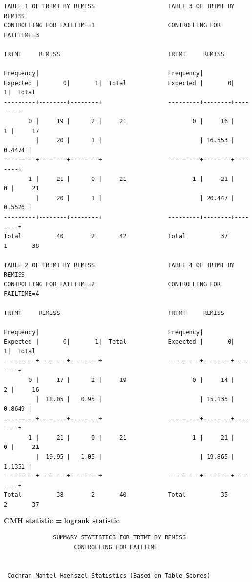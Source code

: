 \documentclass[11pt,slidesonly,semrot,portrait,palatino]{book}
\begin{document}
{\begin{verbatim}
TABLE 1 OF TRTMT BY REMISS                     TABLE 3 OF TRTMT BY REMISS
CONTROLLING FOR FAILTIME=1                     CONTROLLING FOR FAILTIME=3

TRTMT     REMISS                               TRTMT     REMISS

Frequency|                                     Frequency|
Expected |       0|       1|  Total            Expected |       0|       1|  Total
---------+--------+--------+                   ---------+--------+--------+
       0 |     19 |      2 |     21                   0 |     16 |      1 |     17
         |     20 |      1 |                            | 16.553 | 0.4474 |
---------+--------+--------+                   ---------+--------+--------+
       1 |     21 |      0 |     21                   1 |     21 |      0 |     21
         |     20 |      1 |                            | 20.447 | 0.5526 |
---------+--------+--------+                   ---------+--------+--------+
Total          40        2       42            Total          37        1       38

TABLE 2 OF TRTMT BY REMISS                     TABLE 4 OF TRTMT BY REMISS
CONTROLLING FOR FAILTIME=2                     CONTROLLING FOR FAILTIME=4

TRTMT     REMISS                               TRTMT     REMISS

Frequency|                                     Frequency|
Expected |       0|       1|  Total            Expected |       0|       1|  Total
---------+--------+--------+                   ---------+--------+--------+
       0 |     17 |      2 |     19                   0 |     14 |      2 |     16
         |  18.05 |   0.95 |                            | 15.135 | 0.8649 |
---------+--------+--------+                   ---------+--------+--------+
       1 |     21 |      0 |     21                   1 |     21 |      0 |     21
         |  19.95 |   1.05 |                            | 19.865 | 1.1351 |
---------+--------+--------+                   ---------+--------+--------+
Total          38        2       40            Total          35        2       37

\end{verbatim}
{\bf CMH statistic = logrank statistic}
\begin{verbatim}
              SUMMARY STATISTICS FOR TRTMT BY REMISS
                    CONTROLLING FOR FAILTIME


 Cochran-Mantel-Haenszel Statistics (Based on Table Scores)


\end{verbatim}}
\end{document}
